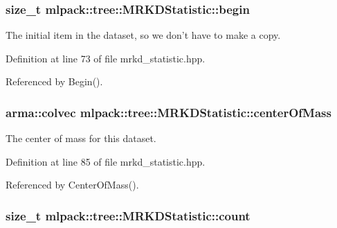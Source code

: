 \subsubsection[{begin}]{\setlength{\rightskip}{0pt plus 5cm}size\-\_\-t mlpack\-::tree\-::\-M\-R\-K\-D\-Statistic\-::begin\hspace{0.3cm}{\ttfamily [private]}}\label{classmlpack_1_1tree_1_1MRKDStatistic_a1d4dc6e6cc0f5dcede4fb8ff00cfde4c}


The initial item in the dataset, so we don't have to make a copy. 



Definition at line 73 of file mrkd\-\_\-statistic.\-hpp.



Referenced by Begin().

\subsubsection[{center\-Of\-Mass}]{\setlength{\rightskip}{0pt plus 5cm}arma\-::colvec mlpack\-::tree\-::\-M\-R\-K\-D\-Statistic\-::center\-Of\-Mass\hspace{0.3cm}{\ttfamily [private]}}\label{classmlpack_1_1tree_1_1MRKDStatistic_a9f94c59aa70794c2afd217dafe2ba1b3}


The center of mass for this dataset. 



Definition at line 85 of file mrkd\-\_\-statistic.\-hpp.



Referenced by Center\-Of\-Mass().

\subsubsection[{count}]{\setlength{\rightskip}{0pt plus 5cm}size\-\_\-t mlpack\-::tree\-::\-M\-R\-K\-D\-Statistic\-::count\hspace{0.3cm}{\ttfamily [private]}}\label{classmlpack_1_1tree_1_1MRKDStatistic_a2de2df81ba40b86bf0f5147be1af8a1e}


